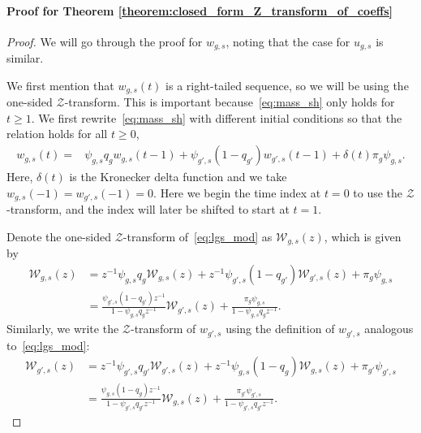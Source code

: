 \documentclass[letterpaper]{article} %
\begin{document}
\paragraph{Proof for Theorem \ref{theorem:closed_form_Z_transform_of_coeffs}}
\begin{proof}
We will go through the proof for $w_{g,s}$, noting that the case for $u_{g,s}$ is similar. 

We first mention that $w_{g,s}(t)$ is a right-tailed sequence, so we will be using the one-sided $\mathcal{Z}$-transform. 
This is important because~\eqref{eq:mass_sh} only holds for $t \geq 1$. 
We first rewrite~\eqref{eq:mass_sh} with different initial conditions so that the relation holds for all $t \geq 0$,
\begin{align}
    w_{g,s}(t) = &\psi_{g,s} q_g w_{g,s}(t-1) + \psi_{g',s}(1-q_{g'}) w_{g',s}(t-1) \label{eq:lgs_mod} + \delta(t) \pi_g \psi_{g,s}.
\end{align}
Here, $\delta(t)$ is the Kronecker delta function and we take $w_{g,s}(-1) = w_{g',s}(-1) = 0$.
Here we begin the time index at $t=0$ to use the $\mathcal{Z}$-transform, and the index will later be shifted to start at $t=1$.

Denote the one-sided $\mathcal{Z}$-transform of~\eqref{eq:lgs_mod} as $\mathcal{W}_{g,s}(z)$, which is given by
\begin{align}
   \mathcal{W}_{g,s}(z) &= z^{-1} \psi_{g,s}q_g \mathcal{W}_{g,s}(z) + z^{-1} \psi_{g',s}(1-q_{g'}) \mathcal{W}_{g',s}(z) + \pi_g \psi_{g,s} \nonumber \\
   &= \frac{\psi_{g',s}(1-q_{g'})z^{-1}}{1 - \psi_{g,s}q_gz^{-1}}\mathcal{W}_{g',s}(z) + \frac{\pi_g \psi_{g,s}}{1 - \psi_{g,s}q_gz^{-1}}. \label{eq:zlgs}
\end{align}
Similarly, we write the $\mathcal{Z}$-transform of $w_{g',s}$ using the definition of $w_{g',s}$ analogous to~\eqref{eq:lgs_mod}:
\begin{align}
   \mathcal{W}_{g',s}(z) &= z^{-1} \psi_{g',s}q_{g'} \mathcal{W}_{g',s}(z) + z^{-1} \psi_{g,s}(1-q_{g}) \mathcal{W}_{g,s}(z) + \pi_{g'} \psi_{g',s} \nonumber\\
   &= \frac{\psi_{g,s}(1-q_{g})z^{-1}}{1 - \psi_{g',s}q_{g'}z^{-1}}\mathcal{W}_{g,s}(z) + \frac{\pi_{g'} \psi_{g',s}}{1 - \psi_{g',s}q_{g'}z^{-1}}. \label{eq:zlg's}
\end{align}


\end{proof}
\end{document}
